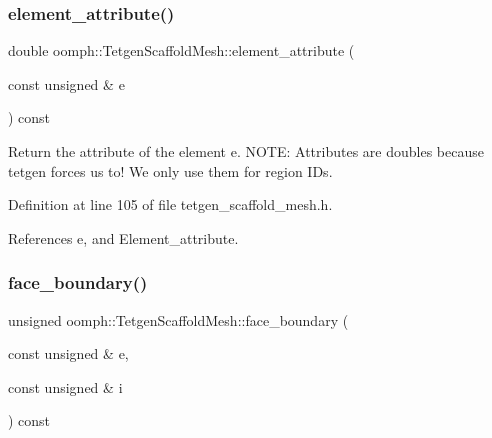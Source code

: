 \mbox{\label{classoomph_1_1TetgenScaffoldMesh_a9a116f1e40f23e7ef0a3317a79165cc9}} 
\subsubsection{\texorpdfstring{element\+\_\+attribute()}{element\_attribute()}}
{\footnotesize\ttfamily double oomph\+::\+Tetgen\+Scaffold\+Mesh\+::element\+\_\+attribute (\begin{DoxyParamCaption}\item[{const unsigned \&}]{e }\end{DoxyParamCaption}) const\hspace{0.3cm}{\ttfamily [inline]}}



Return the attribute of the element e. N\+O\+TE\+: Attributes are doubles because tetgen forces us to! We only use them for region I\+Ds. 



Definition at line 105 of file tetgen\+\_\+scaffold\+\_\+mesh.\+h.



References e, and Element\+\_\+attribute.

\mbox{\label{classoomph_1_1TetgenScaffoldMesh_a44fcd8871bd1441ed353fd86fac7015c}} 
\subsubsection{\texorpdfstring{face\+\_\+boundary()}{face\_boundary()}}
{\footnotesize\ttfamily unsigned oomph\+::\+Tetgen\+Scaffold\+Mesh\+::face\+\_\+boundary (\begin{DoxyParamCaption}\item[{const unsigned \&}]{e,  }\item[{const unsigned \&}]{i }\end{DoxyParamCaption}) const\hspace{0.3cm}{\ttfamily [inline]}}



